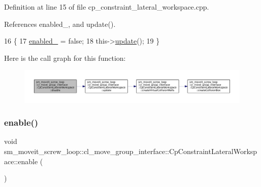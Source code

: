 Definition at line 15 of file cp\+\_\+constraint\+\_\+lateral\+\_\+workspace.\+cpp.



References enabled\+\_\+, and update().


\begin{DoxyCode}
16         \{
17             \hyperlink{classsm__moveit__screw__loop_1_1cl__move__group__interface_1_1CpConstraintLateralWorkspace_a4f987ccb3af2696d5a543aacaa8e8855}{enabled\_} = \textcolor{keyword}{false};
18             this->\hyperlink{classsm__moveit__screw__loop_1_1cl__move__group__interface_1_1CpConstraintLateralWorkspace_a2c742726dc5d521fba7a357dc4ec3dac}{update}();
19         \}
\end{DoxyCode}
Here is the call graph for this function\+:
\nopagebreak
\begin{figure}[H]
\begin{center}
\leavevmode
\includegraphics[width=350pt]{classsm__moveit__screw__loop_1_1cl__move__group__interface_1_1CpConstraintLateralWorkspace_a65f69ec94f60890ee6c5130a3f010fe6_cgraph}
\end{center}
\end{figure}
\mbox{\label{classsm__moveit__screw__loop_1_1cl__move__group__interface_1_1CpConstraintLateralWorkspace_a76aabb89cea41039eab63ead7de92a2b}} 
\subsubsection{\texorpdfstring{enable()}{enable()}}
{\footnotesize\ttfamily void sm\+\_\+moveit\+\_\+screw\+\_\+loop\+::cl\+\_\+move\+\_\+group\+\_\+interface\+::\+Cp\+Constraint\+Lateral\+Workspace\+::enable (\begin{DoxyParamCaption}{ }\end{DoxyParamCaption})}



